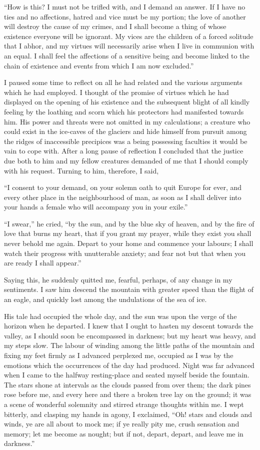 \documentclass[12pt,openright]{book}
\begin{document}
“How is this? I must not be trifled with, and I demand an answer. If I have no ties and no affections, hatred and vice must be my portion; the love of another will destroy the cause of my crimes, and I shall become a thing of whose existence everyone will be ignorant. My vices are the children of a forced solitude that I abhor, and my virtues will necessarily arise when I live in communion with an equal. I shall feel the affections of a sensitive being and become linked to the chain of existence and events from which I am now excluded.”

I paused some time to reflect on all he had related and the various arguments which he had employed. I thought of the promise of virtues which he had displayed on the opening of his existence and the subsequent blight of all kindly feeling by the loathing and scorn which his protectors had manifested towards him. His power and threats were not omitted in my calculations; a creature who could exist in the ice-caves of the glaciers and hide himself from pursuit among the ridges of inaccessible precipices was a being possessing faculties it would be vain to cope with. After a long pause of reflection I concluded that the justice due both to him and my fellow creatures demanded of me that I should comply with his request. Turning to him, therefore, I said,

“I consent to your demand, on your solemn oath to quit Europe for ever, and every other place in the neighbourhood of man, as soon as I shall deliver into your hands a female who will accompany you in your exile.”

“I swear,” he cried, “by the sun, and by the blue sky of heaven, and by the fire of love that burns my heart, that if you grant my prayer, while they exist you shall never behold me again. Depart to your home and commence your labours; I shall watch their progress with unutterable anxiety; and fear not but that when you are ready I shall appear.”

Saying this, he suddenly quitted me, fearful, perhaps, of any change in my sentiments. I saw him descend the mountain with greater speed than the flight of an eagle, and quickly lost among the undulations of the sea of ice.

His tale had occupied the whole day, and the sun was upon the verge of the horizon when he departed. I knew that I ought to hasten my descent towards the valley, as I should soon be encompassed in darkness; but my heart was heavy, and my steps slow. The labour of winding among the little paths of the mountain and fixing my feet firmly as I advanced perplexed me, occupied as I was by the emotions which the occurrences of the day had produced. Night was far advanced when I came to the halfway resting-place and seated myself beside the fountain. The stars shone at intervals as the clouds passed from over them; the dark pines rose before me, and every here and there a broken tree lay on the ground; it was a scene of wonderful solemnity and stirred strange thoughts within me. I wept bitterly, and clasping my hands in agony, I exclaimed, “Oh! stars and clouds and winds, ye are all about to mock me; if ye really pity me, crush sensation and memory; let me become as nought; but if not, depart, depart, and leave me in darkness.”
\end{document}
